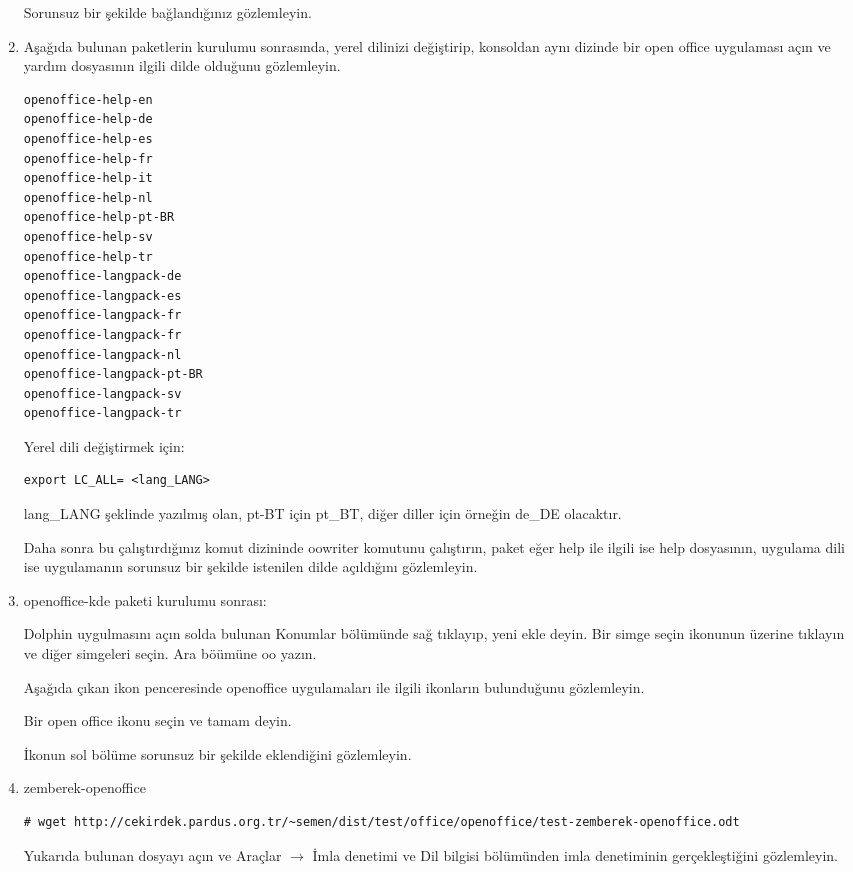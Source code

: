 \documentclass[a4paper,10pt]{article}
\begin{document}
\begin{enumerate}
Sorunsuz bir şekilde bağlandığınız gözlemleyin.

\item Aşağıda bulunan paketlerin kurulumu sonrasında, yerel dilinizi değiştirip, konsoldan aynı dizinde bir open office uygulaması açın ve yardım dosyasının ilgili dilde olduğunu gözlemleyin.
\begin{verbatim}
openoffice-help-en 
openoffice-help-de
openoffice-help-es
openoffice-help-fr
openoffice-help-it
openoffice-help-nl
openoffice-help-pt-BR
openoffice-help-sv
openoffice-help-tr
openoffice-langpack-de
openoffice-langpack-es
openoffice-langpack-fr
openoffice-langpack-fr
openoffice-langpack-nl
openoffice-langpack-pt-BR
openoffice-langpack-sv
openoffice-langpack-tr

\end{verbatim}

Yerel dili değiştirmek için:
\begin{verbatim}
export LC_ALL= <lang_LANG>
\end{verbatim}

lang\_LANG şeklinde yazılmış olan, pt-BT için pt\_BT, diğer diller için örneğin de\_DE olacaktır.

Daha sonra bu çalıştırdığınız komut dizininde oowriter komutunu çalıştırın, paket eğer help ile ilgili ise help dosyasının, uygulama dili ise uygulamanın sorunsuz bir şekilde istenilen dilde açıldığını gözlemleyin.


\item openoffice-kde paketi kurulumu sonrası:

Dolphin uygulmasını açın solda bulunan Konumlar bölümünde sağ tıklayıp, yeni ekle deyin. Bir simge seçin ikonunun üzerine tıklayın ve diğer simgeleri seçin. Ara böümüne oo yazın.

Aşağıda çıkan ikon penceresinde openoffice uygulamaları ile ilgili ikonların bulunduğunu gözlemleyin.

Bir open office ikonu seçin ve tamam deyin.

İkonun sol bölüme sorunsuz bir şekilde eklendiğini gözlemleyin.

\item zemberek-openoffice

\begin{verbatim}
# wget http://cekirdek.pardus.org.tr/~semen/dist/test/office/openoffice/test-zemberek-openoffice.odt
\end{verbatim}

Yukarıda bulunan dosyayı açın ve Araçlar $\rightarrow$ İmla denetimi ve Dil bilgisi bölümünden imla denetiminin gerçekleştiğini gözlemleyin.
\end{enumerate}
\end{document}
